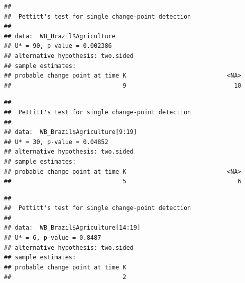 \documentclass[12pt,]{article}
\newenvironment{Shaded}{\begin{snugshade}}{\end{snugshade}}
\newcommand{\KeywordTok}[1]{\textcolor[rgb]{0.13,0.29,0.53}{\textbf{#1}}}
\newcommand{\DecValTok}[1]{\textcolor[rgb]{0.00,0.00,0.81}{#1}}
\newcommand{\CommentTok}[1]{\textcolor[rgb]{0.56,0.35,0.01}{\textit{#1}}}
\newcommand{\OperatorTok}[1]{\textcolor[rgb]{0.81,0.36,0.00}{\textbf{#1}}}
\newcommand{\NormalTok}[1]{#1}
\begin{document}
\begin{Shaded}
\end{Shaded}

\begin{verbatim}
## 
##  Pettitt's test for single change-point detection
## 
## data:  WB_Brazil$Agriculture
## U* = 90, p-value = 0.002386
## alternative hypothesis: two.sided
## sample estimates:
## probable change point at time K                            <NA> 
##                               9                              10
\end{verbatim}

\begin{Shaded}
\end{Shaded}

\begin{verbatim}
## 
##  Pettitt's test for single change-point detection
## 
## data:  WB_Brazil$Agriculture[9:19]
## U* = 30, p-value = 0.04852
## alternative hypothesis: two.sided
## sample estimates:
## probable change point at time K                            <NA> 
##                               5                               6
\end{verbatim}

\begin{Shaded}
\end{Shaded}

\begin{verbatim}
## 
##  Pettitt's test for single change-point detection
## 
## data:  WB_Brazil$Agriculture[14:19]
## U* = 6, p-value = 0.8487
## alternative hypothesis: two.sided
## sample estimates:
## probable change point at time K 
##                               2
\end{verbatim}
\end{document}
